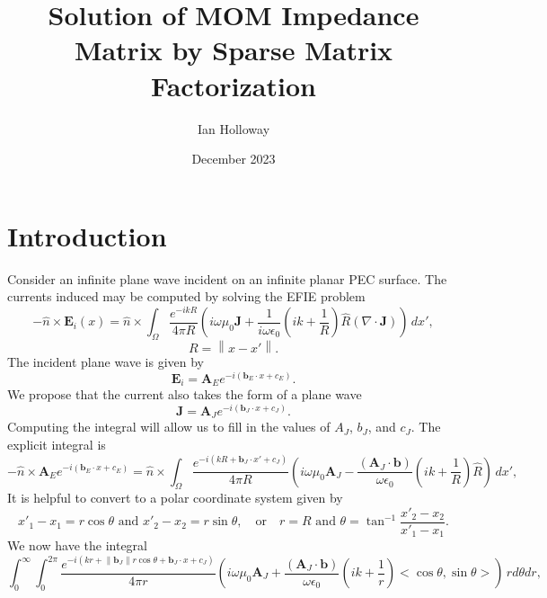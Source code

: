 \documentclass{article}
\title{Solution of MOM Impedance Matrix by Sparse Matrix Factorization}
\author{Ian Holloway}
\date{December 2023}
\newcommand{\norm}[1]{\left\lVert #1 \right\rVert}
\theoremstyle{plain}
\begin{document}
\maketitle

\section{Introduction}\label{sec_intro}

Consider an infinite plane wave incident on an infinite planar PEC surface.
The currents induced may be computed by solving the EFIE problem
\begin{equation}
	-\hat{n}\times\mathbf{E}_i(x) = \hat{n}\times\int_\Omega \frac{e^{-ikR}}{4\pi R}
	\left( i\omega\mu_0\mathbf{J} 
	+ \frac{1}{i\omega\epsilon_0}\left( ik + \frac{1}{R} \right) \hat{R} (\nabla\cdot\mathbf{J}) \right) \,dx',
\end{equation}
\begin{equation}
	R = \norm{x-x'}.
\end{equation}
The incident plane wave is given by
\begin{equation}
	\mathbf{E}_i = \mathbf{A}_Ee^{-i(\mathbf{b}_E\cdot x + c_E)}.
\end{equation}
We propose that the current also takes the form of a plane wave
\begin{equation}
	\mathbf{J} = \mathbf{A}_Je^{-i(\mathbf{b}_J\cdot x + c_J)}.
\end{equation}
Computing the integral will allow us to fill in the values of $A_J$, $b_J$, and $c_J$.
The explicit integral is
\begin{equation}
	-\hat{n}\times\mathbf{A}_Ee^{-i(\mathbf{b}_E\cdot x + c_E)}
	= \hat{n}\times\int_\Omega \frac{e^{-i(kR+\mathbf{b}_J\cdot x' + c_J)}}{4\pi R}
	\left( i\omega\mu_0 \mathbf{A}_J
	- \frac{(\mathbf{A}_J\cdot\mathbf{b})}{\omega\epsilon_0}\left( ik + \frac{1}{R} \right) \hat{R} \right) \,dx',
\end{equation}
It is helpful to convert to a polar coordinate system given by
\begin{equation}
	x'_1-x_1 = r\cos{\theta} \text{ and } x'_2-x_2 = r\sin{\theta}, \quad\text{or}\quad r = R \text{ and } \theta = \tan^{-1}{\frac{x'_2 - x_2}{x'_1 - x_1}}.
\end{equation}
We now have the integral
\begin{equation}
	\int_0^\infty \int_0^{2\pi} \frac{e^{-i(kr+\norm{\mathbf{b}_J}r\cos{\theta} + \mathbf{b}_J\cdot x + c_J)}}{4\pi r}
	\left( i\omega\mu_0 \mathbf{A}_J
	+ \frac{(\mathbf{A}_J\cdot\mathbf{b})}{\omega\epsilon_0}\left( ik + \frac{1}{r} \right) <\cos{\theta},\sin{\theta}> \right) \,rd\theta dr,
\end{equation}
\end{document}
